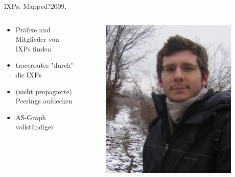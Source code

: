 \documentclass[ngerman,compress,hyperref={bookmarks}]{beamer}
\begin{document}
\begin{frame}{IXPs: Mapped?}{2009, \cite{Augustin:2009:IM:1644893.1644934}}
  \begin{columns}[c]
    \begin{column}{0.5\textwidth}
      \begin{itemize}
        \item Präfixe und Mitglieder von IXPs finden
        \item traceroutes "durch" die IXPs
        \item (nicht propagierte) Peerings aufdecken
        \item AS-Graph vollständiger
      \end{itemize}
    \end{column}
    \begin{column}{0.1\textwidth}
      \begin{figure}
        \label{augustin}
        \includegraphics[width=1\textwidth]{images/augustin_b}\\

\end{figure}
\end{column}
\end{columns}
\end{frame}
\end{document}
